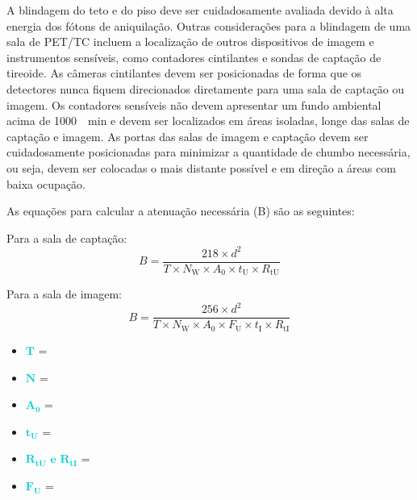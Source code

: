 \documentclass[11pt,a4paper]{article}
\newcounter{exemplo}
\begin{document}
	A blindagem do teto e do piso deve ser cuidadosamente avaliada devido à alta energia dos fótons de aniquilação. Outras considerações para a blindagem de uma sala de PET/TC incluem a localização de outros dispositivos de imagem e instrumentos sensíveis, como contadores cintilantes e sondas de captação de tireoide. As câmeras cintilantes devem ser posicionadas de forma que os detectores nunca fiquem direcionados diretamente para uma sala de captação ou imagem. Os contadores sensíveis não devem apresentar um fundo ambiental acima de \SI{1000}{\per\minute} e devem ser localizados em áreas isoladas, longe das salas de captação e imagem. As portas das salas de imagem e captação devem ser cuidadosamente posicionadas para minimizar a quantidade de chumbo necessária, ou seja, devem ser colocadas o mais distante possível e em direção a áreas com baixa ocupação.

	As equações para calcular a atenuação necessária (B) são as seguintes:

	Para a sala de captação:
	\begin{equation}
		B = \frac{{218 \times d^2 }}{{T \times N_{\text{W}} \times A_{\text{0}} \times t_{\text{U}} \times R_{\text{tU}}}}
	\end{equation}

	Para a sala de imagem:
	\begin{equation}
		B = \frac{{256 \times d^2 }}{{T \times N_{\text{W}} \times A_{\text{0}} \times F_{\text{U}} \times t_{\text{I}} \times R_{\text{tI}}}}
	\end{equation}

	\begin{exemplo}[onde]
		\begin{itemize}
			\item \textcolor{DarkTurquoise}{$\mathbf{T}$} =  
			\item \textcolor{DarkTurquoise}{$\mathbf{N}$} =  
			\item \textcolor{DarkTurquoise}{$\mathbf{A_{\text{0}}}$} =  
			\item \textcolor{DarkTurquoise}{$\mathbf{t_{\text{U}}}$} = 
			\item \textcolor{DarkTurquoise}{$\mathbf{R_{\text{tU}} \text{ e } R_{\text{tI}}}$} = 
			\item \textcolor{DarkTurquoise}{$\mathbf{F_{\text{U}}}$} = 
		\end{itemize}
		
	\end{exemplo}
\end{document}
